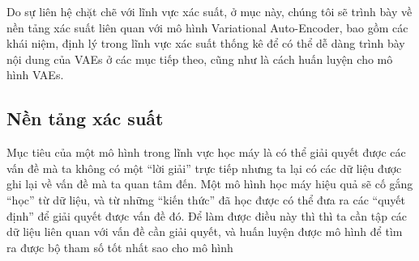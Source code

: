         Do sự liên hệ chặt chẽ với lĩnh vực xác suất, ở mục này, chúng tôi sẽ trình bày về nền tảng xác suất liên quan với mô hình Variational Auto-Encoder, bao gồm các khái niệm, định lý trong lĩnh vực xác suất thống kê để có thể dễ dàng trình bày nội dung của VAEs ở các mục tiếp theo, cũng như là cách huấn luyện cho mô hình VAEs. 
        

    \subsection{Nền tảng xác suất} \label{chap2/subsec21}
        
        

        Mục tiêu của một mô hình trong lĩnh vực học máy là có thể giải quyết được các vấn đề mà ta không có một ``lời giải'' trực tiếp nhưng ta lại có các dữ liệu được ghi lại về vấn đề mà ta quan tâm đến. Một mô hình học máy hiệu quả sẽ cố gắng ``học'' từ dữ liệu, và từ những ``kiến thức'' đã học được có thể đưa ra các ``quyết định'' để giải quyết được vấn đề đó. Để làm được điều này thì thì ta cần tập các dữ liệu liên quan với vấn đề cần giải quyết, và huấn luyện được mô hình để tìm ra được bộ tham số tốt nhất sao cho mô hình 

